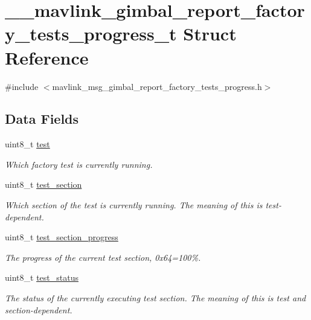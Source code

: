 \hypertarget{struct____mavlink__gimbal__report__factory__tests__progress__t}{\section{\+\_\+\+\_\+mavlink\+\_\+gimbal\+\_\+report\+\_\+factory\+\_\+tests\+\_\+progress\+\_\+t Struct Reference}
\label{struct____mavlink__gimbal__report__factory__tests__progress__t}
}


{\ttfamily \#include $<$mavlink\+\_\+msg\+\_\+gimbal\+\_\+report\+\_\+factory\+\_\+tests\+\_\+progress.\+h$>$}

\subsection*{Data Fields}
\begin{DoxyCompactItemize}
\item 
uint8\+\_\+t \hyperlink{struct____mavlink__gimbal__report__factory__tests__progress__t_acc85d19014b29df419bd5f117b3cd7e3}{test}
\begin{DoxyCompactList}\small\item\em Which factory test is currently running. \end{DoxyCompactList}\item 
uint8\+\_\+t \hyperlink{struct____mavlink__gimbal__report__factory__tests__progress__t_a6eaddd7ec3e423b48e056b96c3bbc639}{test\+\_\+section}
\begin{DoxyCompactList}\small\item\em Which section of the test is currently running. The meaning of this is test-\/dependent. \end{DoxyCompactList}\item 
uint8\+\_\+t \hyperlink{struct____mavlink__gimbal__report__factory__tests__progress__t_ac5fb22f9cac1eafad4126744be4b6bf5}{test\+\_\+section\+\_\+progress}
\begin{DoxyCompactList}\small\item\em The progress of the current test section, 0x64=100\%. \end{DoxyCompactList}\item 
uint8\+\_\+t \hyperlink{struct____mavlink__gimbal__report__factory__tests__progress__t_a8d7590f8ee2d1b7b159aee2a8c928f0d}{test\+\_\+status}
\begin{DoxyCompactList}\small\item\em The status of the currently executing test section. The meaning of this is test and section-\/dependent. \end{DoxyCompactList}\end{DoxyCompactItemize}


